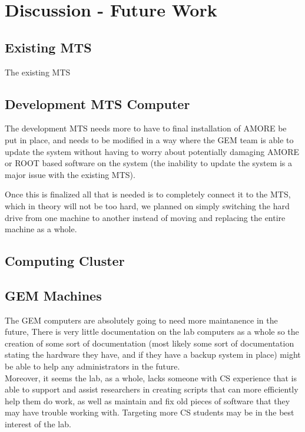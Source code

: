 \documentclass[12pt]{article}
\newcommand\tab[1][1cm]{\hspace*{#1}}
\begin{document}
\section{Discussion - Future Work}

\subsection{Existing MTS}

\tab The existing MTS 

\subsection{Development MTS Computer}

\tab The development MTS needs more to have to final installation of AMORE be put in place, and 
needs to be modified in a way where the GEM team is able to update the system without having to
worry about potentially damaging AMORE or ROOT based software on the system (the inability to
update the system is a major issue with the existing MTS). 

\tab Once this is finalized all that is needed is to completely connect it to the MTS, which 
in theory will not be too hard, we planned on simply switching the hard drive from one machine
to another instead of moving and replacing the entire machine as a whole. 

\subsection{Computing Cluster}

\tab 

\subsection{GEM Machines}

\tab The GEM computers are absolutely going to need more maintanence in the future, There is very
little documentation on the lab computers as a whole so the creation of some sort of documentation
(most likely some sort of documentation stating the hardware they have, and if they have a backup
system in place) might be able to help any administrators in the future. \\
\tab Moreover, it seems the lab, as a whole, lacks someone with CS experience that is able to
support and assist researchers in creating scripts that can more efficiently help them do work,
as well as maintain and fix old pieces of software that they may have trouble working with. Targeting more CS students may be in the best interest of the lab. 
\end{document}
